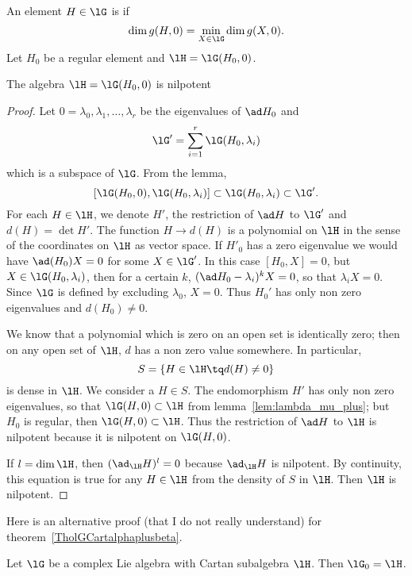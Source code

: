 An element $H\in\lG$ is  if
\[
	\dim g(H,0)=\min_{X\in\lG}\dim g(X,0).
\]
Let $H_0$ be a regular element and $\lH=\lG(H_0,0)$.

\begin{lemma}
	The algebra $\lH=\lG(H_0,0)$ is nilpotent
\end{lemma}

\begin{proof}
	Let $0=\lambda_0,\lambda_1,\ldots,\lambda_r$ be the eigenvalues of $\ad H_0$ and
	\[
		\lG'=\sum_{i=1}^{r} \lG(H_0,\lambda_i)
	\]
	which is a subspace of $\lG$. From the lemma,
	\[
		[\lG(H_0,0),\lG(H_0,\lambda_i)]\subset\lG(H_0,\lambda_i)\subset\lG'.
	\]
	For each $H\in\lH$, we denote $H'$, the restriction of $\ad H$ to $\lG'$ and $d(H)=\det H'$. The function $H\to d(H)$ is a polynomial on $\lH$ in the sense of the coordinates on $\lH$ as vector space. If $H'_0$ has a zero eigenvalue we would have $\ad(H_0)X=0$ for some $X\in\lG'$. In this case $[H_0,X]=0$, but $X\in\lG(H_0,\lambda_i)$, then for a certain $k$, $(\ad H_0-\lambda_i)^kX=0$, so that $\lambda_iX=0$. Since $\lG$ is defined by excluding $\lambda_0$, $X=0$. Thus $H_0'$ has only non zero eigenvalues and $d(H_0)\neq 0$.

	We know that a polynomial which is zero on an open set is identically zero; then on any open set of $\lH$, $d$ has a non zero value somewhere. In particular,
	\[
		S=\{H\in\lH\tq d(H)\neq 0\}
	\]
	is dense in $\lH$. We consider a $H\in S$. The endomorphism $H'$ has only non zero eigenvalues, so that $\lG(H,0)\subset\lH$ from lemma~\ref{lem:lambda_mu_plus}; but $H_0$ is regular, then $\lG(H,0)\subset\lH$. Thus the restriction of $\ad H$ to $\lH$ is nilpotent because it is nilpotent on $\lG(H,0)$.

	If $l=\dim\lH$, then $(\ad_{\lH}H)^l=0$ because $\ad_{\lH}H$ is nilpotent. By continuity, this equation is true for any $H\in\lH$ from the density of $S$ in $\lH$. Then $\lH$ is nilpotent.

\end{proof}


Here is an alternative proof (that I do not really understand) for theorem~\ref{TholGCartalphaplusbeta}.
\begin{theorem}
	Let $\lG$ be a complex Lie algebra with Cartan subalgebra $\lH$. Then $\lG_0=\lH$.
\end{theorem}

